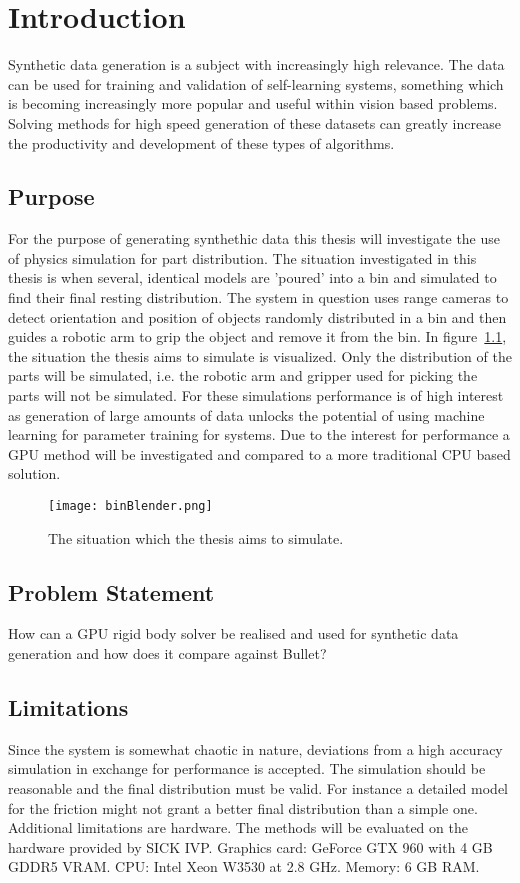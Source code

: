 \chapter{Introduction}\label{cha:intro}

Synthetic data generation is a subject with increasingly high relevance.
The data can be used for training and validation of self-learning systems,
something which is becoming increasingly more popular and useful within vision
based problems. Solving methods for high speed generation of these datasets
can greatly increase the productivity and development of these
types of algorithms.

\section{Purpose}
For the purpose of generating synthethic data this thesis will investigate the use of physics
simulation for part distribution. The situation investigated in this thesis
is when several, identical models are 'poured' into a bin and simulated to find their
final resting distribution. The system in question uses range cameras to detect
orientation and position of objects randomly distributed in a bin and then guides
a robotic arm to grip the object and remove it from the bin.
In figure~\ref{fig:plb}, the situation
the thesis aims to simulate is visualized. Only the distribution of the parts
will be simulated, i.e. the robotic arm and gripper used for picking the parts will not be simulated.
 For these simulations
performance is of high interest as generation of large amounts of data unlocks the potential of using machine learning
for parameter training for systems. Due to the interest for performance a GPU method will
be investigated and compared to a more traditional CPU based solution.

\begin{figure}[ht]
  \centering
  \texttt{[image: binBlender.png]}
  \caption{The situation which the thesis aims to simulate.}
  \label{fig:plb}
\end{figure}

\section{Problem Statement}
How can a GPU rigid body solver be realised and used for synthetic data generation
 and how does it compare against Bullet?

\section{Limitations}
Since the system is somewhat chaotic in nature, deviations from a high accuracy
simulation in exchange for performance is accepted. The simulation should be reasonable
and the final distribution must be valid. For instance a detailed
model for the friction might not grant a better final distribution than a simple one.
Additional limitations are hardware. The methods will be evaluated on the hardware
provided by SICK IVP. Graphics card: GeForce GTX 960 with 4 GB GDDR5 VRAM.
CPU: Intel Xeon W3530 at 2.8 GHz.
Memory: 6 GB RAM.

